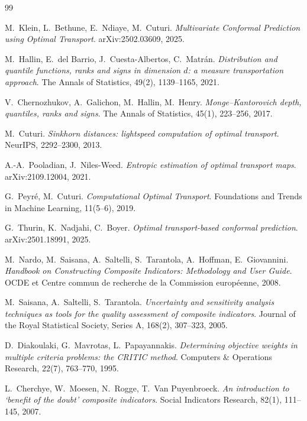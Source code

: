 \documentclass[11pt,a4paper]{article}
\theoremstyle{definition}
\theoremstyle{remark}
\begin{document}
\begin{thebibliography}{99}
\small

M.~Klein, L.~Bethune, E.~Ndiaye, M.~Cuturi.
\emph{Multivariate Conformal Prediction using Optimal Transport}.
arXiv:2502.03609, 2025.

M.~Hallin, E.~del Barrio, J.~Cuesta-Albertos, C.~Matrán.
\emph{Distribution and quantile functions, ranks and signs in dimension $d$: a measure
transportation approach}.
The Annals of Statistics, 49(2), 1139--1165, 2021.

V.~Chernozhukov, A.~Galichon, M.~Hallin, M.~Henry.
\emph{Monge--Kantorovich depth, quantiles, ranks and signs}.
The Annals of Statistics, 45(1), 223--256, 2017.

M.~Cuturi.
\emph{Sinkhorn distances: lightspeed computation of optimal transport}.
NeurIPS, 2292--2300, 2013.

A.-A.~Pooladian, J.~Niles-Weed.
\emph{Entropic estimation of optimal transport maps}.
arXiv:2109.12004, 2021.

G.~Peyré, M.~Cuturi.
\emph{Computational Optimal Transport}.
Foundations and Trends in Machine Learning, 11(5--6), 2019.

G.~Thurin, K.~Nadjahi, C.~Boyer.
\emph{Optimal transport-based conformal prediction}.
arXiv:2501.18991, 2025.

M.~Nardo, M.~Saisana, A.~Saltelli, S.~Tarantola, A.~Hoffman, E.~Giovannini.
\emph{Handbook on Constructing Composite Indicators: Methodology and User Guide}.
OCDE et Centre commun de recherche de la Commission européenne, 2008.

M.~Saisana, A.~Saltelli, S.~Tarantola.
\emph{Uncertainty and sensitivity analysis techniques as tools for the quality assessment of
composite indicators}.
Journal of the Royal Statistical Society, Series A, 168(2), 307--323, 2005.

D.~Diakoulaki, G.~Mavrotas, L.~Papayannakis.
\emph{Determining objective weights in multiple criteria problems: the CRITIC method}.
Computers \& Operations Research, 22(7), 763--770, 1995.

L.~Cherchye, W.~Moesen, N.~Rogge, T.~Van Puyenbroeck.
\emph{An introduction to `benefit of the doubt' composite indicators}.
Social Indicators Research, 82(1), 111--145, 2007.


\end{thebibliography}
\end{document}
